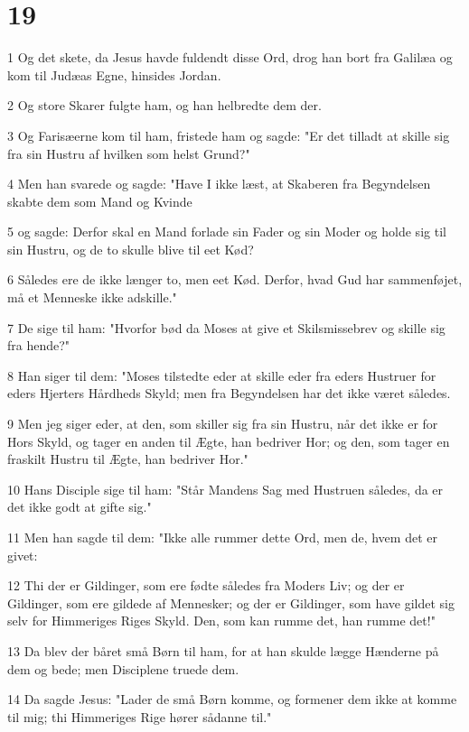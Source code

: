 \chapter{19}

\par 1 Og det skete, da Jesus havde fuldendt disse Ord, drog han bort fra Galilæa og kom til Judæas Egne, hinsides Jordan.
\par 2 Og store Skarer fulgte ham, og han helbredte dem der.
\par 3 Og Farisæerne kom til ham, fristede ham og sagde: "Er det tilladt at skille sig fra sin Hustru af hvilken som helst Grund?"
\par 4 Men han svarede og sagde: "Have I ikke læst, at Skaberen fra Begyndelsen skabte dem som Mand og Kvinde
\par 5 og sagde: Derfor skal en Mand forlade sin Fader og sin Moder og holde sig til sin Hustru, og de to skulle blive til eet Kød?
\par 6 Således ere de ikke længer to, men eet Kød. Derfor, hvad Gud har sammenføjet, må et Menneske ikke adskille."
\par 7 De sige til ham: "Hvorfor bød da Moses at give et Skilsmissebrev og skille sig fra hende?"
\par 8 Han siger til dem: "Moses tilstedte eder at skille eder fra eders Hustruer for eders Hjerters Hårdheds Skyld; men fra Begyndelsen har det ikke været således.
\par 9 Men jeg siger eder, at den, som skiller sig fra sin Hustru, når det ikke er for Hors Skyld, og tager en anden til Ægte, han bedriver Hor; og den, som tager en fraskilt Hustru til Ægte, han bedriver Hor."
\par 10 Hans Disciple sige til ham: "Står Mandens Sag med Hustruen således, da er det ikke godt at gifte sig."
\par 11 Men han sagde til dem: "Ikke alle rummer dette Ord, men de, hvem det er givet:
\par 12 Thi der er Gildinger, som ere fødte således fra Moders Liv; og der er Gildinger, som ere gildede af Mennesker; og der er Gildinger, som have gildet sig selv for Himmeriges Riges Skyld. Den, som kan rumme det, han rumme det!"
\par 13 Da blev der båret små Børn til ham, for at han skulde lægge Hænderne på dem og bede; men Disciplene truede dem.
\par 14 Da sagde Jesus: "Lader de små Børn komme, og formener dem ikke at komme til mig; thi Himmeriges Rige hører sådanne til."
